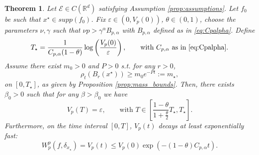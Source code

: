 \documentclass[11pt,handout]{article}%
\numberwithin{equation}{section}
\newcommand{\R}{\mathbb R}
\newtheorem{theorem}{Theorem}[section]
\theoremstyle{definition}
\begin{document}
\begin{theorem}\label{prop:convergence}
	Let $\mathcal{E} \in C(\R^d)$ satisfying Assumption \ref{prop:assumptions}. Let $f_0$ be such that $x^\star \in supp(f_0)$. Fix $\varepsilon \in (0,V_p(0))$, $\theta \in (0,1)$, choose the parameters $\nu,\gamma$ such that $\nu p > \gamma^\alpha B_{p,\alpha}$ with $B_{p,\alpha}$ defined as in \eqref{eq:Cpalpha}. Define 
	\begin{equation}\label{eq:T_star} 
		T_\star = \frac{1}{C_{p,\alpha}(1-\theta)} \log\left( \frac{V_p(0)}{\varepsilon}\right), \qquad \text{with } C_{p,\alpha} \text{ as in \eqref{eq:Cpalpha}}.
	\end{equation}
	Assume there exist $m_0>0$ and $P>0$ s.t. for any $r>0$,
	\begin{equation}\label{eq:bound_mass}
		\rho_t(B_r(x^\star)) \geq m_0 e^{-Pt} :=m_\star,
	\end{equation}
	on $[0,T_\star]$, as given by Proposition \ref{prop:mass_bounds}. Then, there exists $\beta_0>0$ such that for any $\beta>\beta_0$ we have
	\begin{equation}
		V_p(T) = \varepsilon, \qquad \text{with } T\in \left[ \frac{1-\theta}{1+\frac{\theta}{2}} T_\star, T_\star \right].
	\end{equation}
	Furthermore, on the time interval $[0,T]$, $V_p(t)$ decays at least exponentially fast:
	\begin{equation}
		W_p^p(f,\delta_{x_\star}) = V_p(t) \leq V_p(0) \exp(-(1-\theta)C_{p,\alpha}t).
	\end{equation}
\end{theorem}
\end{document}
